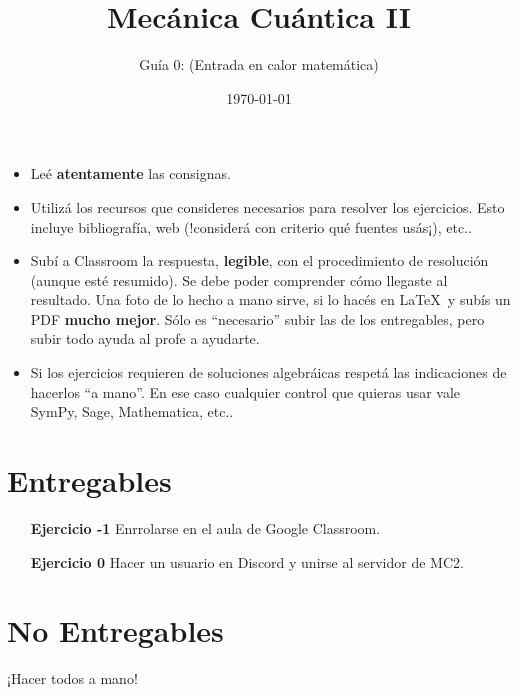 \documentclass[a4paper,12pt]{article}
\begin{document}
\title{Mecánica Cuántica II}

\author{Guía 0: (Entrada en calor matemática)}

\date{\today}

\maketitle

\begin{itemize}
    \item Leé {\bf atentamente} las consignas.
    \item Utilizá los recursos que consideres necesarios para resolver los ejercicios. Esto incluye bibliografía, web (!considerá con criterio qué fuentes usás¡), etc..
    \item Subí a Classroom la respuesta, {\bf legible}, con el procedimiento de resolución (aunque esté resumido). Se debe poder comprender cómo llegaste al resultado. Una foto de lo hecho a mano sirve, si lo hacés en \LaTeX\ y subís un PDF {\bf mucho mejor}. Sólo es ``necesario'' subir las de los entregables, pero subir todo ayuda al profe a ayudarte.
    \item Si los ejercicios requieren de soluciones algebráicas respetá las indicaciones de hacerlos ``a mano''. En ese caso cualquier control que quieras usar vale SymPy, Sage, Mathematica, etc.. 
\end{itemize}

\section*{Entregables}

\begin{enumerate}
    \item[\bf Ejercicio -1] Enrrolarse en el aula de Google Classroom.
    \item[\bf Ejercicio 0] Hacer un usuario en Discord y unirse al servidor de MC2.   
\end{enumerate}

\section*{No Entregables}

\noindent ¡Hacer todos a mano!
\end{document}
